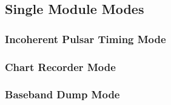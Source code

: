 \subsection{Single Module Modes}
\subsubsection{Incoherent Pulsar Timing Mode}
\subsubsection{Chart Recorder Mode}
\subsubsection{Baseband Dump Mode}

